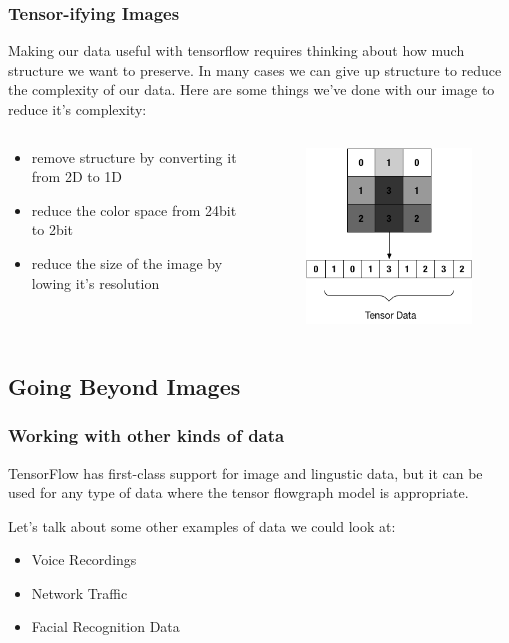 \documentclass{beamer}
\begin{document}
\begin{frame}
  \frametitle{Tensor-ifying Images}

  Making our data useful with tensorflow requires thinking about how
  much structure we want to preserve.  In many cases we can give up
  structure to reduce the complexity of our data.  Here are some
  things we've done with our image to reduce it's complexity:
  \begin{columns}
    \begin{column}{0.5\textwidth}
      \begin{itemize}
      \item remove structure by converting it from 2D to 1D
      \item reduce the color space from 24bit to 2bit
      \item reduce the size of the image by lowing it's resolution
      \end{itemize}
    \end{column}
    \begin{column}{0.5\textwidth}
        \begin{figure}
          \includegraphics[scale=.25]{img/tensor_basic}
        \end{figure}
    \end{column}
  \end{columns}
\end{frame}

\subsection{Going Beyond Images}

\begin{frame}
  \frametitle{Working with other kinds of data}

  TensorFlow has first-class support for image and lingustic data, but
  it can be used for any type of data where the tensor flowgraph model
  is appropriate.

  Let's talk about some other examples of data we could look at:

  \begin{itemize}
  \item Voice Recordings
  \item Network Traffic
  \item Facial Recognition Data
  \end{itemize}
\end{frame}
\end{document}
